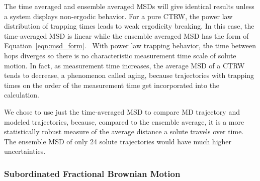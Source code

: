 \documentclass[aps,pre,preprint,groupedaddress]{revtex4-2}
\begin{document}
  
  The time averaged and ensemble averaged MSDs will give identical results 
  unless a system displays non-ergodic behavior. For a pure CTRW, the power 
  law distribution of trapping times leads to weak ergodicity breaking.
  In this case, the time-averaged MSD is linear while the ensemble averaged
  MSD has the form of Equation~\ref{eqn:msd_form}.~\cite{meroz_toolbox_2015} With
  power law trapping behavior, the time between hops diverges so there is no 
  characteristic measurement time scale of solute motion. In fact, as measurement 
  time increases, the average MSD of a CTRW tends to decrease, a phenomenon called
  aging, because trajectories with trapping times on the order of the measurement 
  time get incorporated into the calculation.~\cite{bel_weak_2005}
  
  We chose to 
  use 
  just the time-averaged MSD 
  to compare MD trajectory and modeled trajectories,
  because, compared to the ensemble
  average, it is a more statistically robust measure of the average distance a 
  solute travels over time. The ensemble MSD of only 24 solute trajectories would
  have much higher uncertainties.
  
%  
  
  \subsubsection{Subordinated Fractional Brownian Motion}\label{method:sfbm}


  
\end{document}
